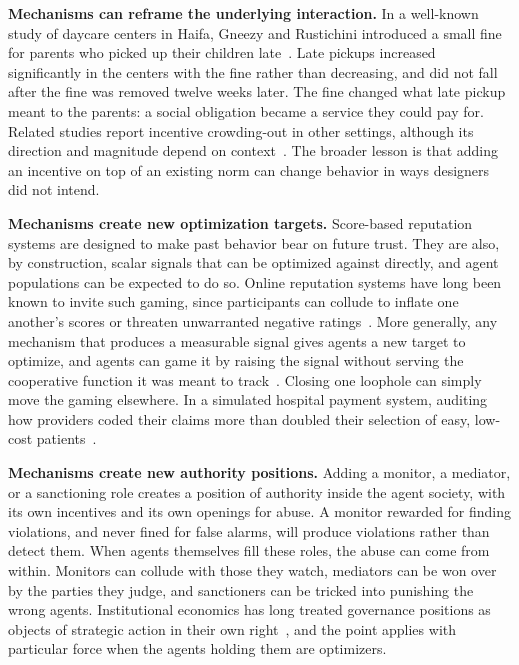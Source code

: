 \documentclass[runningheads]{llncs}
\begin{document}
\textbf{Mechanisms can reframe the underlying interaction.} In a well-known study of daycare centers in Haifa, Gneezy and Rustichini introduced a small fine for parents who picked up their children late~\mbox{\citep{gneezy2000fine}}. Late pickups increased significantly in the centers with the fine rather than decreasing, and did not fall after the fine was removed twelve weeks later. The fine changed what late pickup meant to the parents: a social obligation became a service they could pay for. Related studies report incentive crowding-out in other settings, although its direction and magnitude depend on context~\citep{bowlesPoliciesDesignedSelfInterested2008}. The broader lesson is that adding an incentive on top of an existing norm can change behavior in ways designers did not intend.

\textbf{Mechanisms create new optimization targets.} Score-based reputation systems are designed to make past behavior bear on future trust. They are also, by construction, scalar signals that can be optimized against directly, and agent populations can be expected to do so. Online reputation systems have long been known to invite such gaming, since participants can collude to inflate one another's scores or threaten unwarranted negative ratings~\mbox{\citep{resnickReputationSystems2000}}. More generally, any mechanism that produces a measurable signal gives agents a new target to optimize, and agents can game it by raising the signal without serving the cooperative function it was meant to track~\mbox{\citep{goodhartProblemsMonetaryManagement1984,krakovnaSpecificationGamingFlip2020}}. Closing one loophole can simply move the gaming elsewhere. In a simulated hospital payment system, auditing how providers coded their claims more than doubled their selection of easy, low-cost patients~\mbox{\citep{wang2026medisim}}.

\textbf{Mechanisms create new authority positions.} Adding a monitor, a mediator, or a sanctioning role creates a position of authority inside the agent society, with its own incentives and its own openings for abuse. A monitor rewarded for finding violations, and never fined for false alarms, will produce violations rather than detect them. When agents themselves fill these roles, the abuse can come from within. Monitors can collude with those they watch, mediators can be won over by the parties they judge, and sanctioners can be tricked into punishing the wrong agents. Institutional economics has long treated governance positions as objects of strategic action in their own right~\mbox{\citep{ostromGoverningCommonsEvolution1990}}, and the point applies with particular force when the agents holding them are optimizers.
\end{document}
